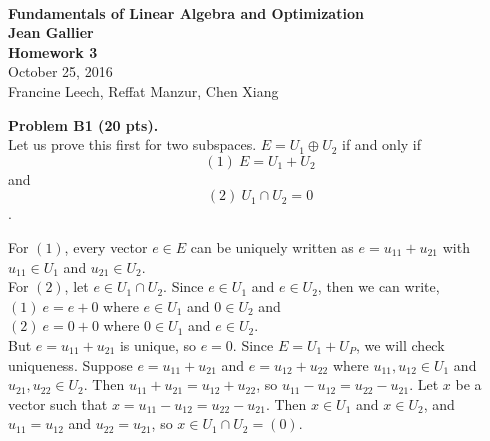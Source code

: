 \documentclass[12pt]{article}
\begin{document}


\begin{center}
\\
\vspace{1cm}
{\Large\bf Fundamentals of Linear Algebra and Optimization\\
Jean Gallier \\
\vspace{0.5cm}
Homework 3}\\[10pt]
October 25, 2016\\
Francine Leech, Reffat Manzur, Chen Xiang \\
\end{center}


\vspace {0.25cm}\noindent
{\bf Problem B1 (20 pts).} \\
Let us prove this first for two subspaces. $E = U_1 \oplus U_2$ if and only if $$ (1)\ E = U_1  + U_2$$ and $$(2)\ U_1 \cap U_2 = {0}$$. 

For $(1)$, every vector $e \in E$ can be uniquely written as $e = u_{11} + u_{21}$ with $u_{11} \in U_1$ and $u_{21} \in U_2$. \\

For $(2)$, let $e \in U_1 \cap U_2$. Since $e \in U_1$ and $e \in U_2$, then we can write, \\

$(1)\ e = e + 0$ where $e \in U_1$ and $0 \in U_2$ and  \\

$(2)\ e = 0 + 0$ where $0 \in U_1$ and $e \in U_2$.  \\ 

But $e = u_{11} + u_{21}$ is unique, so $e=0$. Since $E = U_1 + U_P$, we will check uniqueness. Suppose $e = u_{11} + u_{21}$ and $e = u_{12} + u_{22}$ where $u_{11} , u_{12}  \in U_1$ and $u_{21} , u_{22}  \in U_2$. Then $u_{11} + u_{21} = u_{12} + u_{22}$, so $u_{11} - u_{12} = u_{22} - u_{21}$.  Let $x$ be a vector such that $x = u_{11} - u_{12} = u_{22} - u_{21}$. Then $x \in U_1$ and $x \in U_2$, and $u_{11} = u_{12}$ and $u_{22} = u_{21}$, so $x \in U_1 \cap U_2 = (0)$. \\
\end{document}
